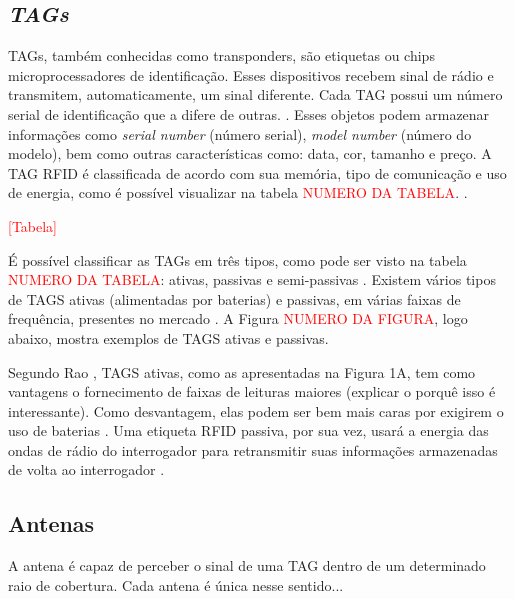 \subsection{\textit{TAGs}}
TAGs, também conhecidas como transponders, são etiquetas ou chips microprocessadores de identificação. Esses dispositivos recebem sinal de rádio e transmitem, automaticamente, um sinal diferente. Cada TAG possui um número serial de identificação que a difere de outras. \cite{chawla2007overview}. Esses objetos podem armazenar informações como \textit{serial number} (número serial), \textit{model number} (número do modelo), bem como outras características como: data, cor, tamanho e preço. A TAG RFID é classificada de acordo com sua memória, tipo de comunicação e uso de energia, como é possível visualizar na tabela \textcolor{red}{NUMERO DA TABELA}.  \cite{AhmedIntegrationStreamMapping}.


\huge \textcolor{red}{[Tabela]} \normalsize

É possível classificar as TAGs em três tipos, como pode ser visto na tabela \textcolor{red}{NUMERO DA TABELA}: ativas, passivas e semi-passivas \cite{chawla2007overview}.  Existem vários tipos de TAGS ativas (alimentadas por baterias) e passivas, em várias faixas de frequência, presentes no mercado \cite{rao1999overview}. A Figura \textcolor{red}{NUMERO DA FIGURA}, logo abaixo, mostra exemplos de TAGS ativas e passivas.

Segundo Rao \cite{rao1999overview}, TAGS ativas, como as apresentadas na Figura 1A, tem como vantagens o fornecimento de faixas de leituras maiores (explicar o porquê isso é interessante). Como desvantagem, elas podem ser bem mais caras por exigirem o uso de baterias \cite{rao1999overview}. Uma etiqueta RFID passiva, por sua vez, usará a energia das ondas de rádio do interrogador para retransmitir suas informações armazenadas de volta ao interrogador \cite{EPC-RFID-link}. 

\subsection{Antenas}

A antena é capaz de perceber o sinal de uma TAG dentro de um determinado raio de cobertura. Cada antena é única nesse sentido...